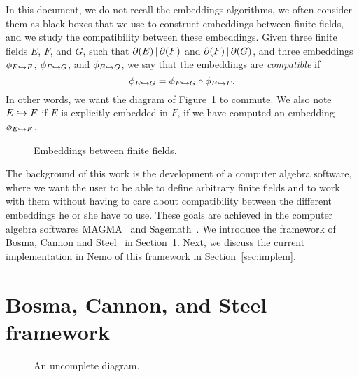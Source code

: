\documentclass[11pt]{article}
\begin{document}
In this document, we do not recall the embeddings algorithms, we often
consider them as black boxes that we use to construct embeddings between
finite fields, and we study the compatibility between these embeddings. Given
three finite fields $E$, $F$, and $G$, such that $\partial(E)\,|\,\partial(F)$ and $\partial(F)\,|\,\partial(G)$, and three embeddings
$\phi_{E\hookrightarrow F}$, $\phi_{F\hookrightarrow G}$, and $\phi_{E\hookrightarrow G}$, we say that the
embeddings are \emph{compatible} if 
\[
  \phi_{E\hookrightarrow G}=\phi_{F\hookrightarrow G}\circ\phi_{E\hookrightarrow F}.
\]
In other words, we want the diagram of Figure~\ref{fig:compatibility} to
commute. We also note $E\hookrightarrow F$ if $E$ is explicitly embedded in $F$, \ie if
we have computed an embedding $\phi_{E\hookrightarrow F}$.
\begin{figure}
  \centering

  \caption{Embeddings between finite fields.}
  \label{fig:compatibility}
\end{figure}
The background of this work is the development of a computer algebra
software, where we want the user to be able to define arbitrary finite
fields and to work with them without having to care about compatibility
between the different embeddings he or she have to use. These goals are
achieved in the computer algebra softwares MAGMA~\cite{Magma} and
Sagemath~\cite{Sagemath}. We introduce the
framework of Bosma, Cannon and Steel~\cite{BCS97} in
Section~\ref{sec:bcs-framework}. Next, we discuss the current implementation in
Nemo of
this framework in Section~\ref{sec:implem}.

\section{Bosma, Cannon, and Steel framework}
\label{sec:bcs-framework}
\begin{figure}
  \centering

  \caption{An uncomplete diagram.}
  \label{fig:uncomplete}
\end{figure}
\end{document}
